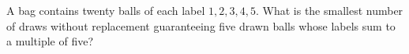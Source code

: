 A bag contains twenty balls of each label $1,2,3,4,5$. What is the smallest number of draws without replacement guaranteeing five drawn balls whose labels sum to a multiple of five?
